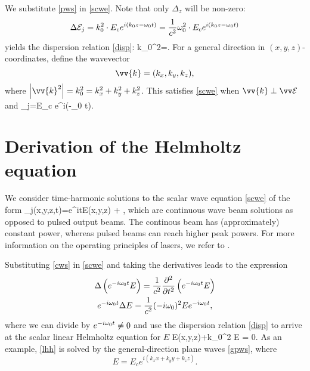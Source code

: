 We substitute \eqref{pws} in \cref{scwe}. Note that only $\Delta_z$ will be non-zero:
$$ \Delta \ec_j = %
k_0^2 \cdot E_c\eikzwt=\frac{1}{c^2} \omega_0^2 \cdot E_c \eikzwt $$
yields the dispersion relation \eqref{disp}:
\be \label{disp} k_0^2=.\ee
% 
For a general direction in $(x,y,z)$-coordinates, define the wavevector 
$$\vv{k}=(k_x,k_y,k_z),$$ 
where $\left|\vv{k}^2\right|=k_0^2=k_x^2+k_y^2+k_z^2$. 
This satisfies \cref{scwe} when $\vv{k}\perp\ev$ and
\be \label{gpws} 
\ec_j=E_c e^{i(\cdot {}-\omega_0 t)}.
\ee
%

\section{Derivation of the Helmholtz equation} 
We consider time-harmonic solutions to the scalar wave equation \eqref{scwe} of
the form \be \label{cws} 
_j(x,y,z,t)=e^{i\ww t}E(x,y,z) + , \ee
%
which are continuous wave beam solutions as opposed to pulsed output beams.
The continous beam has (approximately) constant power, whereas pulsed beams can
reach higher peak powers. For more information on the operating principles of
lasers, we refer to \cite{siegm}.

Substituting \eqref{cws} in \cref{scwe} and taking the derivatives leads to the
expression
\begin{gather*}
\Delta\left(e^{-i\omega_0 t} E\right) = \frac{1}{c^2} \frac{\partial^2}{\partial t^2}
\left( e^{-i\omega_0 t} E \right) \\
e^{-i\omega_0 t}\Delta E = \frac{1}{c^2} (-i\omega_0)^2 E e^{-i\omega_0 t},
\end{gather*}
%
where we can divide by $e^{-i\omega_0 t}\neq0$ and use the dispersion relation
\eqref{disp} to arrive at the scalar linear Helmholtz equation for $E$
%
\be \label{lhh} \Delta E(x,y,z)+k_0^2 E = 0. 
\ee 
%
%
%
As an example, \cref{lhh} is solved by the general-direction plane
waves \eqref{gpws}, where
$$E=E_c e^{i(k_x x + k_y y + k_z z)}.$$ 
%


